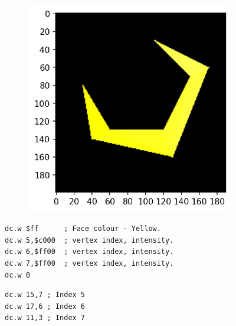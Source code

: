 \begin{figure}[H]
  \centering
  \begin{adjustbox}{width=13cm,center}
    \begin{minipage}[c]{0.48\linewidth}
      \begin{figure}[H]
        \centering
        \begin{adjustbox}{width=5.5cm,center}
          \includegraphics[width=12cm]{src/build_t2k_claws/claw_face_6.png}%
        \end{adjustbox}
      \end{figure}
    \end{minipage}
    \begin{minipage}[c]{0.48\linewidth}
      \begin{lstlisting}[basicstyle=\scriptsize\ttfamily]
dc.w $ff      ; Face colour - Yellow.
dc.w 5,$c000  ; vertex index, intensity.
dc.w 6,$ff00  ; vertex index, intensity.
dc.w 7,$ff00  ; vertex index, intensity.
dc.w 0
      \end{lstlisting}
      \begin{lstlisting}[basicstyle=\scriptsize\ttfamily]
dc.w 15,7 ; Index 5
dc.w 17,6 ; Index 6
dc.w 11,3 ; Index 7
      \end{lstlisting}
      \vspace*{\fill}
    \end{minipage}
  \end{adjustbox}
\end{figure}
